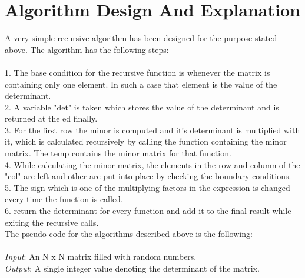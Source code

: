 \documentclass[conference]{IEEEtran}
\begin{document}
\section{Algorithm Design And Explanation}
A very simple recursive algorithm has been designed for the purpose stated above. The algorithm has the following steps:-\\
\\1. The base condition for the recursive function is whenever the matrix is containing only one element. In such a case that element is the value of the determinant.
\\2. A variable "det" is taken which stores the value of the determinant and is returned at the ed finally.
\\3. For the first row the minor is computed and it's determinant is multiplied with it, which is calculated recursively by calling the function containing the minor matrix. The temp contains the minor matrix for that function.
\\4. While calculating the minor matrix, the elements in the row and column of the "col" are left and other are put into place by checking the boundary conditions.
\\5. The sign which is one of the multiplying factors in the expression is changed every time the function is called.
\\6. return the determinant for every function and add it to the final result while exiting the recursive calls.
\\ The pseudo-code for the algorithms described above is the following:-\\
\\\textit{Input}: An N x N matrix filled with random numbers.
\\\textit{Output}: A single integer value denoting the determinant of the matrix.
\bigskip
\end{document}

